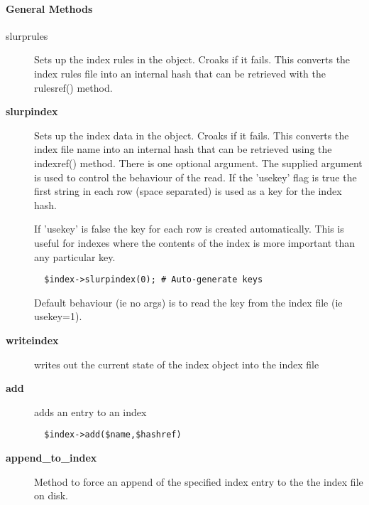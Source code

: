 \paragraph*{General Methods\label{ORAC::Index_General_Methods}}
\begin{description}

\item[slurprules] \mbox{}

Sets up the index rules in the object. Croaks if it fails.
This converts the index rules file into an internal hash
that can be retrieved with the rulesref() method.


\item[\textbf{slurpindex}] \mbox{}

Sets up the index data in the object. Croaks if it fails.  This
converts the index file name into an internal hash that can be
retrieved using the indexref() method.  There is one optional
argument.  The supplied argument is used to control the behaviour of
the read. If the 'usekey' flag is true the first string in each row
(space separated) is used as a key for the index hash.



If 'usekey' is false the key for each row is created 
automatically. This is useful for indexes where the contents 
of the index is more important than any particular key.

\begin{verbatim}
  $index->slurpindex(0); # Auto-generate keys
\end{verbatim}


Default behaviour (ie no args) is to read the key from the
index file (ie usekey=1).


\item[\textbf{writeindex}] \mbox{}

writes out the current state of the index object into the index file


\item[\textbf{add}] \mbox{}

adds an entry to an index

\begin{verbatim}
  $index->add($name,$hashref)
\end{verbatim}

\item[\textbf{append\_to\_index}] \mbox{}

Method to force an append of the specified index entry to the
the index file on disk.


\end{description}
